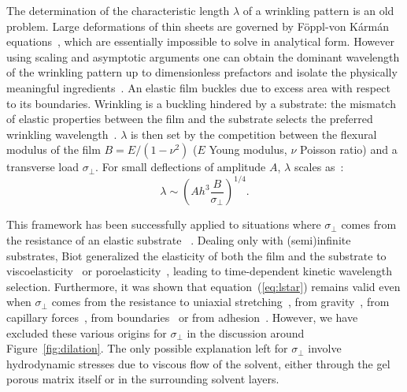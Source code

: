 \documentclass[twocolumn,superscriptaddress,showpacs,preprintnumbers, amsmath,amssymb,prl]{revtex4-1}
\begin{document}

The determination of the characteristic length $\lambda$ of a wrinkling pattern is an old problem. Large deformations of thin sheets are governed by F\"{o}ppl-von K\'arm\'an equations~\cite{landau1986}, which are essentially impossible to solve in analytical form. However using scaling and asymptotic arguments one can obtain the dominant wavelength of the wrinkling pattern up to dimensionless prefactors and isolate the physically meaningful ingredients~\cite{Cerda2003,Davidovitch2011}. An elastic film buckles due to excess area with respect to its boundaries. Wrinkling is a buckling hindered by a substrate: the mismatch of elastic properties between the film and the substrate selects the preferred wrinkling wavelength~\cite{Gough1940, Bijlaard1946}. $\lambda$ is then set by the competition between the flexural modulus of the film $B=E/(1-\nu^2)$ ($E$ Young modulus, $\nu$ Poisson ratio) and a transverse load $\sigma_\perp$. For small deflections of  amplitude $A$, $\lambda$ scales as~\cite{Vella2009,Kolinski2009}: 
%
\begin{equation}
\lambda \sim \left( A h^3 \frac{B}{\sigma_{\perp}} \right)^{1/4}.
\label{eq:lstar}
\end{equation}



This framework has been successfully applied to situations where $\sigma_{\perp}$ comes from the resistance of an elastic substrate ~\cite{Gough1940, Bijlaard1946}. Dealing only with (semi)infinite substrates, Biot generalized the elasticity of both the film and the substrate to viscoelasticity~\cite{Biot1957} or poroelasticity~\cite{Biot1964}, leading to time-dependent kinetic wavelength selection. Furthermore, it was shown that equation~(\ref{eq:lstar}) remains valid even when $\sigma_{\perp}$ comes from the resistance to uniaxial stretching~\cite{Cerda2003}, from gravity~\cite{Smoluchowski1910, Kolinski2009, Vella2009, Pineirua2013, Lucantonio2013}, from capillary forces~\cite{Huang2007}, from boundaries~\cite{Vandeparre2011a, Li2013} or from adhesion~\cite{Vella2009a}. However, we have excluded these various origins for $\sigma_{\perp}$ in the discussion around Figure~\ref{fig:dilation}.
%
The only possible explanation left for $\sigma_{\perp}$ involve hydrodynamic stresses due to viscous flow of the solvent, either through the gel porous matrix itself or in the surrounding solvent layers.
\end{document}
